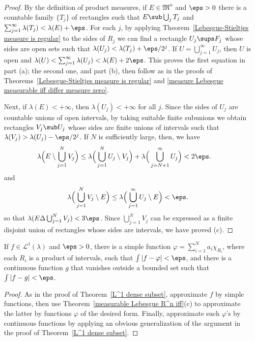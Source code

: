 \begin{proof}
By the definition of product measures, if $E\in\mathfrak{M}^n$ and $\eps>0$ there is a countable family $\{T_j\}$ of rectangles such that $E\sub\bigcup_jT_j$ and $\sum_{j=1}^{\infty}\lambda(T_j)<\lambda(E)+\eps$. For each $j$, by applying Theorem~\ref{Lebesgue-Stieltjes measure is regular} to the sides of $R_j$ we can find a rectangle $U_j\sups F_j$ whose sides are open sets such that $\lambda(U_j)<\lambda(T_j)+\eps/2^j$. If $U=\bigcup_{j=1}^{\infty}U_j$, then $U$ is open and $\lambda(U)<\sum_{j=1}^{\infty}\lambda(U_j)<\lambda(E)+2\eps$. This proves the first equation in part (a); the second one, and part (b), then follow as in the proofs of Theorems~\ref{Lebesgue-Stieltjes measure is regular} and \ref{measure Lebesgue measurable iff differ measure zero}.\par
Next, if $\lambda(E)<+\infty$, then $\lambda(U_j)<+\infty$ for all $j$. Since the sides of $U_j$ are countable unions of open intervals, by taking suitable finite subunions we obtain rectangles $V_j\sub U_j$ whose sides are finite unions of intervals such that $\lambda(V_j)>\lambda(U_j)-\eps/2^j$. If $N$ is sufficiently large, then, we have
\begin{align*}
\lambda\Big(E\setminus\bigcup_{j=1}^{N}V_j\Big)&\leq\lambda\Big(\bigcup_{j=1}^{N}U_j\setminus V_j\Big)+\lambda\Big(\bigcup_{j=N+1}^{\infty}U_j\Big)<2\eps.
\end{align*}
and
\begin{align*}
\lambda\Big(\bigcup_{j=1}^{N}V_j\setminus E\Big)\leq\lambda\Big(\bigcup_{j=1}^{\infty}U_j\setminus E\Big)<\eps.
\end{align*}
so that $\lambda(E\Delta\bigcup_{j=1}^{N}V_j)<3\eps$. Since $\bigcup_{j=1}^{N}V_j$ can be expressed as a finite disjoint union of rectangles whose sides are intervals, we have proved (c).
\end{proof}
\begin{theorem}
If $f\in\mathcal{L}^1(\lambda)$ and $\eps>0$, there is a simple function $\varphi=\sum_{i=1}^{N}a_i\chi_{R_i}$, where each $R_i$ is a product of intervals, such that $\int|f-\varphi|<\eps$, and there is a continuous function $g$ that vanishes outside a bounded set such that $\int|f-g|<\eps$.
\end{theorem}
\begin{proof}
As in the proof of Theorem~\ref{L^1 dense subset}, approximate $f$ by simple functions, then use Theorem~\ref{measurable Lebesgue R^n iff}(c) to approximate the latter by functions $\varphi$ of the desired form. Finally, approximate such $\varphi$'s by continuous functions by applying an obvious generalization of the argument in the proof of Theorem~\ref{L^1 dense subset}.
\end{proof}
